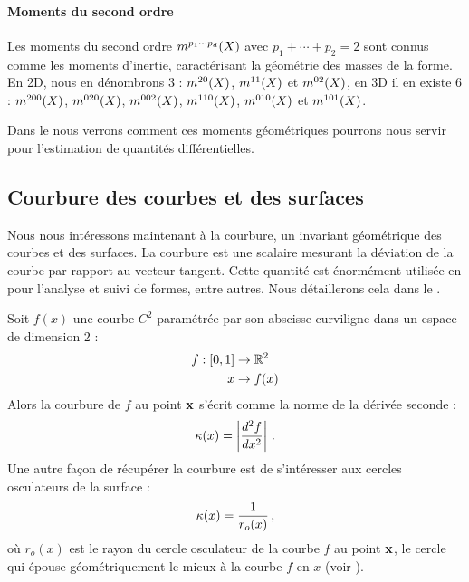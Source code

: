 \paragraph{Moments du second ordre}
%
Les moments du second ordre $m^{p_1 \cdots p_d}(X)$ avec $p_1 + \cdots +
p_2 = 2$ sont connus comme les moments d'inertie, caractérisant la géométrie des
masses de la forme. En 2D, nous en dénombrons 3 : $m^{2 0}(X)$, $m^{1
1}(X)$ et $m^{0 2}(X)$, en 3D il en existe 6 :  $m^{2 0
0}(X)$, $m^{0 2 0}(X)$, $m^{0 0 2}(X)$, $m^{1 1
0}(X)$, $m^{0 1 0}(X)$ et $m^{1 0 1}(X)$.
%

Dans le  nous verrons comment ces moments
géométriques pourrons nous servir pour l'estimation de quantités différentielles.

\subsection{Courbure des courbes et des surfaces}
%
Nous nous intéressons maintenant à la courbure, un invariant géométrique des
courbes et des surfaces. La courbure est une scalaire mesurant la déviation de
la courbe par rapport au vecteur tangent. Cette quantité est énormément utilisée
en \GeometryProcessing pour l'analyse et suivi de formes, entre autres. Nous
détaillerons cela dans le .


%
%
Soit $f(x)$ une courbe $C^2$ paramétrée par son abscisse curviligne
dans un espace de dimension $2$ :
%
\begin{align}
    f : [0,1] &\rightarrow \mathbb{R}^2 \nonumber\\
    x &\rightarrow f(x)
\end{align}
%
Alors la courbure de $f$ au point $\mathbf{x}$ s'écrit comme la norme de la dérivée
seconde :
%
\begin{equation}
  \kappa(x) = \left| \frac{d^2f}{dx^2} \right| \,.
\end{equation}
%
Une autre façon de récupérer la courbure est de s'intéresser aux
cercles osculateurs de la surface :
%
\begin{equation}
  \kappa(x) = \frac{1}{r_o(x)} \,,
\end{equation}
%
où $r_o(x)$ est le rayon du cercle osculateur de la courbe $f$ au point $\mathbf{x}$,
\cad le cercle qui épouse géométriquement le mieux à la courbe $f$ en
$x$ (voir ).

